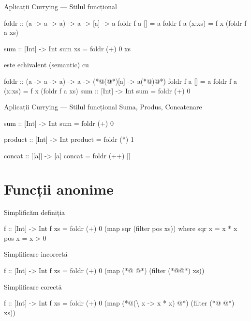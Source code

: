 \documentclass[xcolor=pdftex,romanian,colorlinks]{beamer}
\begin{document}
\begin{frame}[fragile]{Aplicații Currying --- Stilul funcțional}
\begin{asciihs}
foldr :: (a -> a -> a) -> a -> [a] -> a
foldr f a []     = a
foldr f a (x:xs) = f x (foldr f a xs)

sum :: [Int] -> Int
sum xs = foldr (+) 0 xs
\end{asciihs}
este echivalent (semantic) cu 
\begin{asciihs}
foldr :: (a -> a -> a) -> a -> (*@\color{blue}(@*)[a] -> a(*@\color{blue})@*)
foldr f a []     = a
foldr f a (x:xs) = f x (foldr f a xs)
sum :: [Int] -> Int
sum = foldr (+) 0
\end{asciihs}
\end{frame}


\begin{frame}[fragile]{Aplicații Currying --- Stilul funcțional}
{Suma, Produs, Concatenare}
\begin{asciihs}
sum :: [Int] -> Int
sum = foldr (+) 0

product :: [Int] -> Int
product = foldr (*) 1

concat :: [[a]] -> [a]
concat = foldr (++) []
\end{asciihs}
\end{frame}

\section{Funcții anonime}

\begin{frame}[fragile]{Simplificăm definiția}
\begin{asciihs}
f :: [Int] -> Int
f xs = foldr (+) 0 (map sqr (filter pos xs))
  where
    sqr x = x * x
    pos x = x > 0
\end{asciihs}
\begin{alertblock}{Simplificare incorectă}
\begin{asciihs}
f :: [Int] -> Int
f xs = foldr (+) 0 (map (*@\color{red}{(x * x)} @*) (filter (*@\color{red}{(x > 0)}@*) xs))
\end{asciihs}
\end{alertblock}
\begin{block}{Simplificare corectă}
\begin{asciihs}
f :: [Int] -> Int
f xs = foldr (+) 0 
         (map (*@\color{blue}(\textbackslash\; x -> x * x) @*) 
            (filter (*@\color{blue}{(\textbackslash\; x -> x > 0)} @*) xs))
\end{asciihs}
\end{block}
\end{frame}
\end{document}
